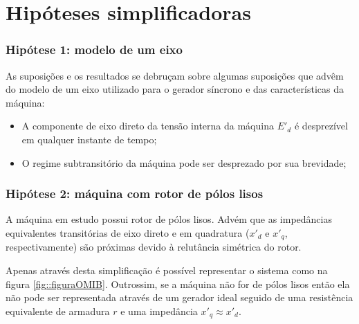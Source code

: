 \documentclass[10pt, compress,xcolor={svgnames,dvipsnames,x11names}]{beamer}
\begin{document}
\section{Hipóteses simplificadoras}%
\begin{frame}%
\frametitle{Hipótese 1: modelo de um eixo}
\scriptsize

	As suposições e os resultados se debruçam sobre algumas suposições que advêm do \alert{modelo de um eixo} utilizado para o gerador síncrono e das características da máquina:

	\begin{itemize}
		\item A componente de eixo direto da tensão interna da máquina $E'_d$ é desprezível em qualquer instante de tempo;
		\item O regime subtransitório da máquina pode ser desprezado por sua brevidade; 
	\end{itemize}

\normalsize
\end{frame}%

\begin{frame}%
\frametitle{Hipótese 2: máquina com rotor de pólos lisos}
\scriptsize

	A máquina em estudo possui rotor de pólos lisos. Advém que as impedâncias equivalentes transitórias de eixo direto e em quadratura ($x'_d$ e $x'_q$, respectivamente) são próximas devido à relutância simétrica do rotor.

	Apenas através desta simplificação é possível representar o sistema como na figura \ref{fig::figuraOMIB}. Outrossim, se a máquina não for de pólos lisos então ela não pode ser representada através de um gerador ideal seguido de uma resistência equivalente de armadura $r$ e uma impedância $x'_q \approx x'_d$.

\normalsize
\end{frame}%
\end{document}

